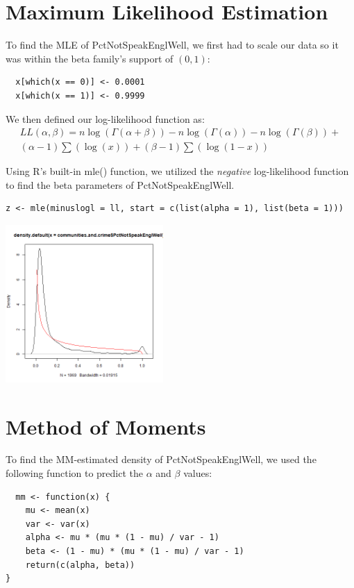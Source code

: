 \documentclass[12pt, letterpaper]{report}
\begin{document}
\pagebreak
\section{Maximum Likelihood Estimation}
To find the MLE of PctNotSpeakEnglWell, we first had to scale our data so it was within the beta family's support of $(0, 1)$: 
\begin{lstlisting}
  x[which(x == 0)] <- 0.0001  
  x[which(x == 1)] <- 0.9999
\end{lstlisting} 

We then defined our log-likelihood function as:
\begin{multline}
LL(\alpha, \beta) = n \log{(\Gamma(\alpha+\beta))} - n \log{(\Gamma(\alpha))} - n \log{(\Gamma(\beta))} + \\
(\alpha - 1) \sum(\log(x)) + (\beta-1) \sum(\log{(1-x)})
\end{multline}

Using R's built-in mle() function, we utilized the \textit{negative} log-likelihood function to find the beta parameters of PctNotSpeakEnglWell.
\begin{lstlisting}
z <- mle(minuslogl = ll, start = c(list(alpha = 1), list(beta = 1)))
\end{lstlisting} 

\begin{center}
\includegraphics[width=0.45\textwidth]{beta/PctNotSpeakEnglWell_mle}
\end{center}

\pagebreak
\section{Method of Moments}
To find the MM-estimated density of PctNotSpeakEnglWell, we used the following function to predict the $\alpha$ and $\beta$ values:
\begin{lstlisting}
  mm <- function(x) {
    mu <- mean(x)
    var <- var(x)
    alpha <- mu * (mu * (1 - mu) / var - 1)
    beta <- (1 - mu) * (mu * (1 - mu) / var - 1)
    return(c(alpha, beta))
}
\end{lstlisting} 
\end{document}
